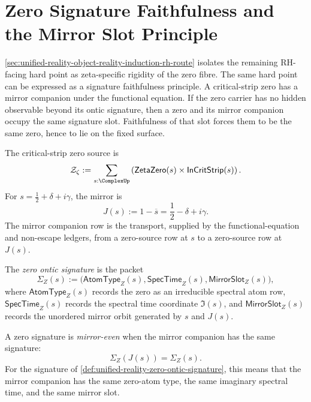 \section{Zero Signature Faithfulness and the Mirror Slot Principle}
\label{sec:unified-reality-zero-signature-faithfulness}

\autoref{sec:unified-reality-object-reality-induction-rh-route} isolates
the remaining RH-facing hard point as zeta-specific rigidity of the
zero fibre.  The same hard point can be expressed as a signature
faithfulness principle.  A critical-strip zero has a mirror companion
under the functional equation.  If the zero carrier has no hidden
observable beyond its ontic signature, then a zero and its mirror
companion occupy the same signature slot.  Faithfulness of that slot
forces them to be the same zero, hence to lie on the fixed surface.

\begin{definition}
\label{def:unified-reality-zero-source-mirror-companion}
The critical-strip zero source is
$$
\mathcal Z_{\zeta}
:=
\sum_{s:\ComplexUp}
\left(
\mathsf{ZetaZero}(s)\times\mathsf{InCritStrip}(s)
\right).
$$
For $s=\frac12+\delta+i\gamma$, the mirror is
$$
J(s):=1-\overline{s}
=
\frac12-\delta+i\gamma.
$$
The mirror companion row is the transport, supplied by the
functional-equation and non-escape ledgers, from a zero-source row at
$s$ to a zero-source row at $J(s)$.
\end{definition}

\begin{definition}
\label{def:unified-reality-zero-ontic-signature}
The \emph{zero ontic signature} is the packet
$$
\Sigma_Z(s)
:=
\bigl(
\mathsf{AtomType}_Z(s),
\mathsf{SpecTime}_Z(s),
\mathsf{MirrorSlot}_Z(s)
\bigr),
$$
where $\mathsf{AtomType}_Z(s)$ records the zero as an irreducible
spectral atom row, $\mathsf{SpecTime}_Z(s)$ records the spectral time
coordinate $\Im(s)$, and $\mathsf{MirrorSlot}_Z(s)$ records the
unordered mirror orbit generated by $s$ and $J(s)$.
\end{definition}

\begin{definition}
\label{def:unified-reality-mirror-even-zero-signature}
A zero signature is \emph{mirror-even} when the mirror companion has the
same signature:
$$
\Sigma_Z(J(s))=\Sigma_Z(s).
$$
For the signature of
\autoref{def:unified-reality-zero-ontic-signature}, this means that the
mirror companion has the same zero-atom type, the same imaginary
spectral time, and the same mirror slot.
\end{definition}

